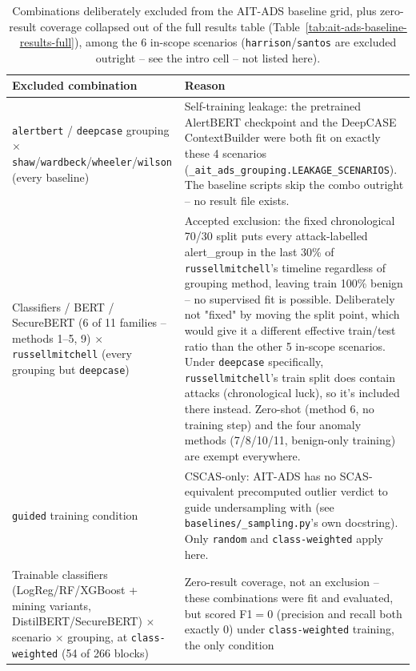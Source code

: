 \begin{table}[htbp]
\centering
\small
\caption{Combinations deliberately excluded from the AIT-ADS baseline grid, plus
zero-result coverage collapsed out of the full results table
(Table~\ref{tab:ait-ads-baseline-results-full}), among the 6 in-scope scenarios
(\texttt{harrison}/\texttt{santos} are excluded outright -- see the intro cell --
not listed here).}
\label{tab:ait-ads-grid-exclusions}
\begin{tabular}{p{}p{}}
\toprule
\textbf{Excluded combination} & \textbf{Reason} \\
\midrule
\texttt{alertbert} / \texttt{deepcase} grouping $\times$
\texttt{shaw}/\texttt{wardbeck}/\texttt{wheeler}/\texttt{wilson} (every
baseline) &
Self-training leakage: the pretrained AlertBERT checkpoint and the DeepCASE
ContextBuilder were both fit on exactly these 4 scenarios
(\texttt{\_ait\_ads\_grouping.LEAKAGE\_SCENARIOS}). The baseline scripts skip
the combo outright -- no result file exists. \\[4pt]
Classifiers / BERT / SecureBERT (6 of 11 families -- methods 1--5, 9) $\times$
\texttt{russellmitchell} (every grouping but \texttt{deepcase}) &
Accepted exclusion: the fixed chronological 70/30 split puts every
attack-labelled alert\_group in the last 30\% of \texttt{russellmitchell}'s
timeline regardless of grouping method, leaving train 100\% benign -- no
supervised fit is possible. Deliberately not "fixed" by moving the split
point, which would give it a different effective train/test ratio than the
other 5 in-scope scenarios. Under \texttt{deepcase} specifically,
\texttt{russellmitchell}'s train split does contain attacks (chronological
luck), so it's included there instead. Zero-shot (method 6, no training
step) and the four anomaly methods (7/8/10/11, benign-only training) are
exempt everywhere. \\[4pt]
\texttt{guided} training condition &
CSCAS-only: AIT-ADS has no SCAS-equivalent precomputed outlier verdict to
guide undersampling with (see \texttt{baselines/\_sampling.py}'s own
docstring). Only \texttt{random} and \texttt{class-weighted} apply here. \\[4pt]
Trainable classifiers (LogReg/RF/XGBoost + mining variants,
DistilBERT/SecureBERT) $\times$ scenario $\times$ grouping, at
\texttt{class-weighted} (54 of 266 blocks) &
Zero-result coverage, not an exclusion -- these combinations were fit and
evaluated, but scored F1$=0$ (precision and recall both exactly 0) under
\texttt{class-weighted} training, the only condition

\end{tabular}
\end{table}
